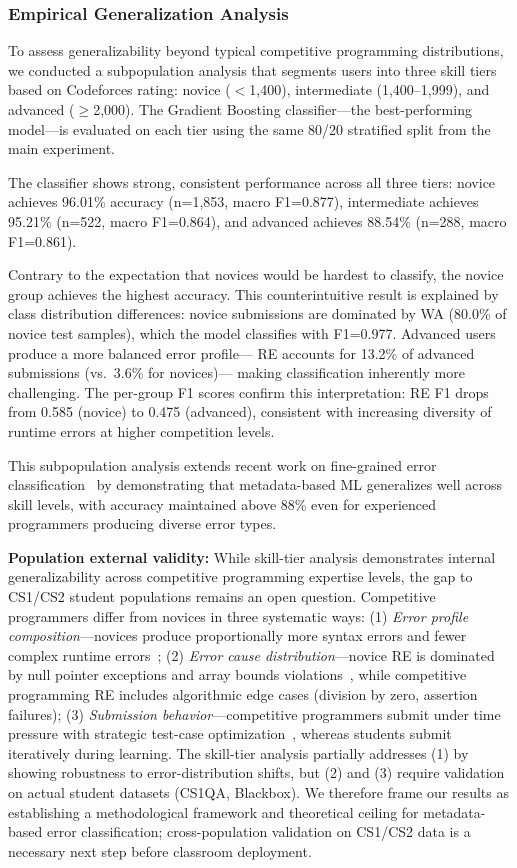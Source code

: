 \documentclass[acmsmall]{acmart}
\begin{document}
\subsubsection*{Empirical Generalization Analysis}
To assess generalizability beyond typical competitive programming
distributions, we conducted a subpopulation analysis that segments users into
three skill tiers based on Codeforces rating: novice ($<$1,400), intermediate
(1,400--1,999), and advanced ($\geq$2,000). The Gradient Boosting
classifier---the best-performing model---is evaluated on each tier using the
same 80/20 stratified split from the main experiment.

The classifier shows strong, consistent performance across all three tiers:
novice achieves 96.01\% accuracy (n=1,853, macro F1=0.877), intermediate
achieves 95.21\% (n=522, macro F1=0.864), and advanced achieves 88.54\%
(n=288, macro F1=0.861).

Contrary to the expectation that novices would be hardest to classify,
the novice group achieves the highest accuracy. This counterintuitive result
is explained by class distribution differences: novice submissions are
dominated by WA (80.0\% of novice test samples), which the model classifies
with F1=0.977. Advanced users produce a more balanced error profile---
RE accounts for 13.2\% of advanced submissions (vs.\ 3.6\% for novices)---
making classification inherently more challenging. The per-group F1 scores
confirm this interpretation: RE F1 drops from 0.585 (novice) to 0.475
(advanced), consistent with increasing diversity of runtime errors at higher
competition levels.

This subpopulation analysis extends recent work on fine-grained error
classification~\cite{altadmri2015most} by demonstrating that
metadata-based ML generalizes well across skill levels, with accuracy
maintained above 88\% even for experienced programmers producing diverse
error types.

\textbf{Population external validity:} While skill-tier analysis demonstrates
internal generalizability across competitive programming expertise levels, the
gap to CS1/CS2 student populations remains an open question. Competitive
programmers differ from novices in three systematic ways: (1) \emph{Error
profile composition}---novices produce proportionally more syntax errors and
fewer complex runtime errors~\cite{altadmri2015most}; (2) \emph{Error cause
distribution}---novice RE is dominated by null pointer exceptions and array
bounds violations~\cite{jadud2006exploring}, while competitive programming RE
includes algorithmic edge cases (division by zero, assertion failures); (3)
\emph{Submission behavior}---competitive programmers submit under time pressure
with strategic test-case optimization~\cite{peres2019hacker}, whereas students
submit iteratively during learning. The skill-tier analysis partially addresses
(1) by showing robustness to error-distribution shifts, but (2) and (3) require
validation on actual student datasets (CS1QA, Blackbox). We therefore frame
our results as establishing a methodological framework and theoretical ceiling
for metadata-based error classification; cross-population validation on CS1/CS2
data is a necessary next step before classroom deployment.
\end{document}
